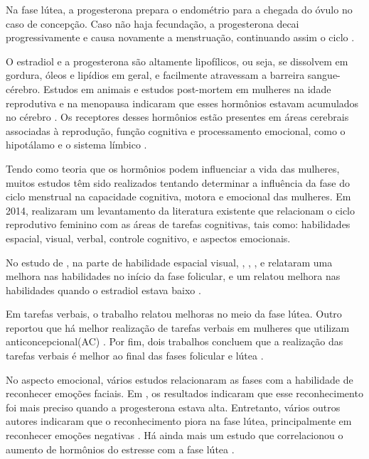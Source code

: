 Na fase lútea, a progesterona prepara o endométrio para a chegada do óvulo no caso de concepção. 
Caso não haja fecundação, a progesterona decai progressivamente e causa novamente a menstruação, 
continuando assim o ciclo \cite{nikas2003}.


O estradiol e a progesterona são altamente lipofílicos, ou seja, se dissolvem em gordura, óleos e 
lipídios em geral, e facilmente atravessam a barreira sangue-cérebro. Estudos em animais e estudos 
post-mortem em mulheres na idade reprodutiva e na menopausa indicaram que esses hormônios estavam 
acumulados no cérebro \cite{bixo1997}. Os receptores desses hormônios estão presentes em áreas 
cerebrais associadas à reprodução, função cognitiva e processamento emocional, como o hipotálamo e o 
sistema límbico \cite{gruber2002, brinton2008}.


Tendo como teoria que os hormônios podem influenciar a vida das mulheres, muitos estudos têm sido 
realizados tentando determinar a influência da fase do ciclo menstrual na capacidade cognitiva, 
motora e emocional das mulheres. Em 2014,  realizaram um levantamento da 
literatura existente que relacionam o ciclo reprodutivo feminino com as áreas de tarefas cognitivas, 
tais como: habilidades espacial, visual, verbal, controle cognitivo, e aspectos emocionais.


No estudo de , na parte de habilidade espacial visual, 
, , ,  e  relataram uma melhora 
nas habilidades no início da fase folicular, e um relatou melhora nas habilidades quando o 
estradiol estava baixo \cite{hampson2014}. 


Em tarefas verbais, o trabalho \cite{maki2002} relatou melhoras no meio da fase lútea. Outro 
reportou que há melhor realização de tarefas verbais em mulheres que utilizam anticoncepcional(AC) 
\cite{mordecai2008}. Por fim, dois trabalhos concluem que a realização das tarefas verbais é melhor 
ao final das fases folicular e lútea \cite{Rosenberg2002, solis2004}.


No aspecto emocional, vários estudos relacionaram as fases com a habilidade de reconhecer emoções 
faciais. Em , os resultados indicaram que esse reconhecimento foi mais 
preciso quando a progesterona estava alta. Entretanto, vários outros autores indicaram que o 
reconhecimento piora na fase lútea, principalmente em reconhecer emoções negativas \cite{gasbarri2008}.
 Há ainda mais um estudo que correlacionou o aumento de hormônios do estresse com a fase lútea \cite{kirschbaum1999}.



